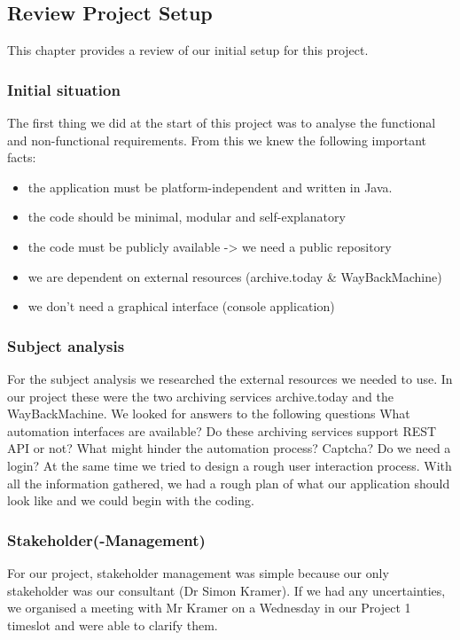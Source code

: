 \subsection{Review Project Setup}
This chapter provides a review of our initial setup for this project. 

\subsubsection{Initial situation}
The first thing we did at the start of this project was to analyse the functional and non-functional requirements. 
From this we knew the following important facts:
\begin{itemize}
    \item the application must be platform-independent and written in Java.
    \item the code should be minimal, modular and self-explanatory
    \item the code must be publicly available -> we need a public repository
    \item we are dependent on external resources (archive.today & WayBackMachine)
    \item we don't need a graphical interface (console application)
\end{itemize}

\subsubsection{Subject analysis}
For the subject analysis we researched the external resources we needed to use. In our project these were the two archiving services archive.today and the WayBackMachine.
We looked for answers to the following questions 
What automation interfaces are available? Do these archiving services support REST API or not? What might hinder the automation process? Captcha?
Do we need a login? 
At the same time we tried to design a rough user interaction process.
With all the information gathered, we had a rough plan of what our application should look like and we could begin with the coding.

\subsubsection{Stakeholder(-Management)}
For our project, stakeholder management was simple because our only stakeholder was our consultant (Dr Simon Kramer).
If we had any uncertainties, we organised a meeting with Mr Kramer on a Wednesday in our Project 1 timeslot and were able to clarify them.

